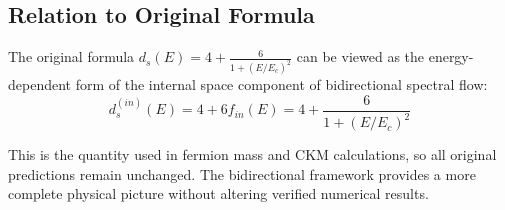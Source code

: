 \subsection{Relation to Original Formula}

The original formula $d_s(E) = 4 + \frac{6}{1+(E/E_c)^2}$ can be viewed as the energy-dependent form of the internal space component of bidirectional spectral flow:
\begin{equation}
d_s^{(in)}(E) = 4 + 6f_{in}(E) = 4 + \frac{6}{1+(E/E_c)^2}
\end{equation}

This is the quantity used in fermion mass and CKM calculations, so all original predictions remain unchanged. The bidirectional framework provides a more complete physical picture without altering verified numerical results.
